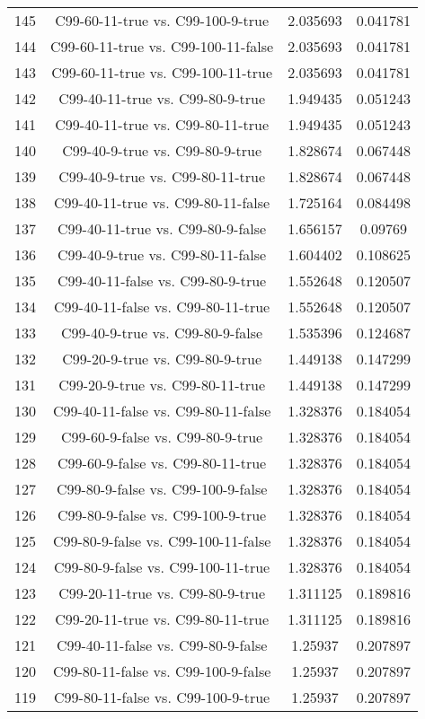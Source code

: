 \documentclass[a4paper,10pt]{article}
\begin{document}
\begin{landscape}
\begin{table}[!htp]
\begin{tabular}{cccc}
145&C99-60-11-true vs. C99-100-9-true&2.035693&0.041781\\
144&C99-60-11-true vs. C99-100-11-false&2.035693&0.041781\\
143&C99-60-11-true vs. C99-100-11-true&2.035693&0.041781\\
142&C99-40-11-true vs. C99-80-9-true&1.949435&0.051243\\
141&C99-40-11-true vs. C99-80-11-true&1.949435&0.051243\\
140&C99-40-9-true vs. C99-80-9-true&1.828674&0.067448\\
139&C99-40-9-true vs. C99-80-11-true&1.828674&0.067448\\
138&C99-40-11-true vs. C99-80-11-false&1.725164&0.084498\\
137&C99-40-11-true vs. C99-80-9-false&1.656157&0.09769\\
136&C99-40-9-true vs. C99-80-11-false&1.604402&0.108625\\
135&C99-40-11-false vs. C99-80-9-true&1.552648&0.120507\\
134&C99-40-11-false vs. C99-80-11-true&1.552648&0.120507\\
133&C99-40-9-true vs. C99-80-9-false&1.535396&0.124687\\
132&C99-20-9-true vs. C99-80-9-true&1.449138&0.147299\\
131&C99-20-9-true vs. C99-80-11-true&1.449138&0.147299\\
130&C99-40-11-false vs. C99-80-11-false&1.328376&0.184054\\
129&C99-60-9-false vs. C99-80-9-true&1.328376&0.184054\\
128&C99-60-9-false vs. C99-80-11-true&1.328376&0.184054\\
127&C99-80-9-false vs. C99-100-9-false&1.328376&0.184054\\
126&C99-80-9-false vs. C99-100-9-true&1.328376&0.184054\\
125&C99-80-9-false vs. C99-100-11-false&1.328376&0.184054\\
124&C99-80-9-false vs. C99-100-11-true&1.328376&0.184054\\
123&C99-20-11-true vs. C99-80-9-true&1.311125&0.189816\\
122&C99-20-11-true vs. C99-80-11-true&1.311125&0.189816\\
121&C99-40-11-false vs. C99-80-9-false&1.25937&0.207897\\
120&C99-80-11-false vs. C99-100-9-false&1.25937&0.207897\\
119&C99-80-11-false vs. C99-100-9-true&1.25937&0.207897\\

\end{tabular}
\end{table}
\end{landscape}
\end{document}

